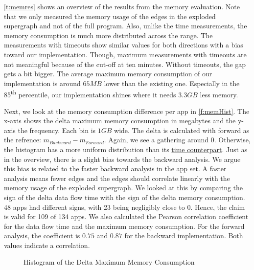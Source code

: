 \documentclass[../draft.tex]{subfiles}
\begin{document}
    \autoref{t:memres} shows an overview of the results from the memory evaluation.
    Note that we only measured the memory usage of the edges in the exploded supergraph and not of the full program.
    Also, unlike the time measurements, the memory consumption is much more distributed across the range.
    The measurements with timeouts show similar values for both directions with a bias toward our implementation.
    Though, maximum measurements with timeouts are not meaningful because of the cut-off at ten minutes.
    Without timeouts, the gap gets a bit bigger.
    The average maximum memory consumption of our implementation is around $65MB$ lower than the existing one. 
    Especially in the 85\textsuperscript{th} percentile, our implementation shines where it needs $3.3GB$ less memory.

    Next, we look at the memory consumption difference per app in \autoref{f:memHist}.
    The x-axis shows the delta maximum memory consumption in megabytes and the y-axis the frequency.
    Each bin is $1GB$ wide.
    The delta is calculated with forward as the refrence: $m_{\mathit{Backward}}-m_{\mathit{Forward}}$.
    Again, we see a gathering around $0$. 
    Otherwise, the histogram has a more uniform distribution than its \hyperref[f:deltaHist]{time counterpart}.
    Just as in the overview, there is a slight bias towards the backward analysis.
    We argue this bias is related to the faster backward analysis in the app set. 
    A faster analysis means fewer edges\footnotemark{} and the edges should correlate linearly with the memory usage of the exploded supergraph.
    We looked at this by comparing the sign of the delta data flow time with the sign of the delta memory consumption. 
    48 apps had different signs, with 23 being negligibly close to 0. 
    Hence, the claim is valid for 109 of 134 apps.
    We also calculated the Pearson correlation coefficient for the data flow time and the maximum memory consumption.
    For the forward analysis, the coefficient is $0.75$ and $0.87$ for the backward implementation.
    Both values indicate a correlation.

    \begin{figure}[tbp]
        \centering
        \resizebox{0.75\columnwidth}{!}{
            
        }
        \caption{Histogram of the Delta Maximum Memory Consumption}
        \label{f:memHist}
    \end{figure}
\end{document}
